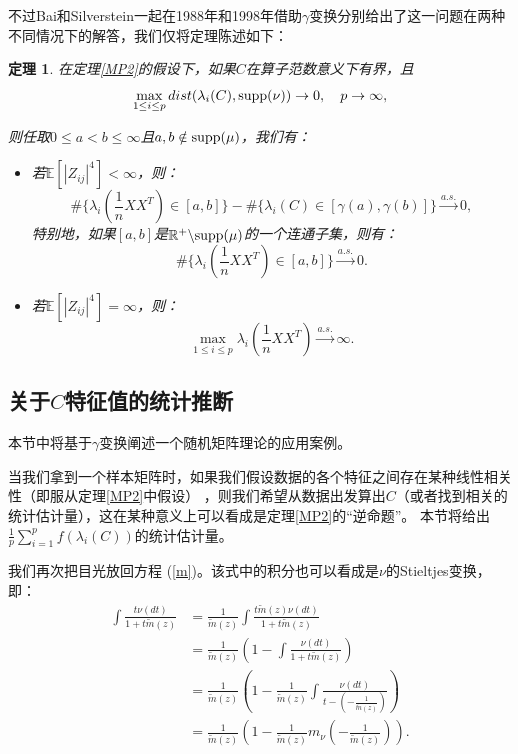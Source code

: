 \documentclass[UTF8,12pt]{ctexart}
\newtheorem{theorem}{定理}
\begin{document}
不过Bai和Silverstein一起在1988年和1998年借助$\gamma$变换分别给出了这一问题在两种不同情况下的解答\cite{gamma2}\cite{gamma1}，我们仅将定理陈述如下：

\begin{theorem}
    在定理\ref{MP2}的假设下，如果$C$在算子范数意义下有界，且
    \[
        \max\limits_{1 \leq i \leq p} dist(\lambda_i(C), \textup{supp}(\nu)) \rightarrow 0,
        \quad p \rightarrow \infty,
    \]

    则任取$0 \leq a < b \leq \infty$且$a,b \notin \textup{supp}(\mu)$，我们有：
    \begin{itemize}
        \item 若$\mathbb E[|Z_{ij}|^4] < \infty$，则：
        \[
            \#\{
                \lambda_i(\frac{1}{n}XX^T) \in [a,b]
            \}  -
            \#\{
                \lambda_i(C) \in [\gamma(a),\gamma(b)]
            \}  
            \stackrel{a.s.}{\longrightarrow} 0,
        \]
        特别地，如果$[a,b]$是$\mathbb R^+ \backslash \textup{supp}(\mu)$的一个连通子集，则有：
        \[
            \#\{
                \lambda_i(\frac{1}{n}XX^T) \in [a,b]
            \} 
            \stackrel{a.s.}{\longrightarrow} 0.
        \]
        \item 若$\mathbb E[|Z_{ij}|^4] = \infty$，则：
        \[
            \max\limits_{1 \leq i \leq p} \lambda_i(\frac{1}{n}XX^T) \stackrel{a.s.}{\longrightarrow} \infty.
        \]  
    \end{itemize}
\end{theorem}

\subsection{关于$C$特征值的统计推断}

本节中将基于$\gamma$变换阐述一个随机矩阵理论的应用案例。

当我们拿到一个样本矩阵时，如果我们假设数据的各个特征之间存在某种线性相关性（即服从定理\ref{MP2}中假设）
，则我们希望从数据出发算出$C$（或者找到相关的统计估计量），这在某种意义上可以看成是定理\ref{MP2}的“逆命题”。
本节将给出$\frac{1}{p}\sum\limits_{i=1}^p f(\lambda_i(C))$的统计估计量。

我们再次把目光放回方程 (\ref{m})。该式中的积分也可以看成是$\nu$的Stieltjes变换，即：
\begin{equation*}
    \begin{aligned}
        \int \frac{t\nu(dt)}{1+t\tilde m(z)} & = \frac{1}{\tilde m(z)} \int \frac{t \tilde m(z)\nu(dt)}{1 +t\tilde m(z)} \\
        & = \frac{1}{\tilde m(z)} (1 - \int\frac{\nu(dt)}{1+t\tilde m(z)}) \\
        & = \frac{1}{\tilde m(z)} (1 - \frac{1}{\tilde m(z)} \int \frac{\nu(dt)}{t-(-\frac{1}{\tilde m(z)})}) \\
        & = \frac{1}{\tilde m(z)}(1 - \frac{1}{\tilde m(z)} m_{\nu}(-\frac{1}{\tilde m(z)})).\\
    \end{aligned}
\end{equation*}  
\end{document}

